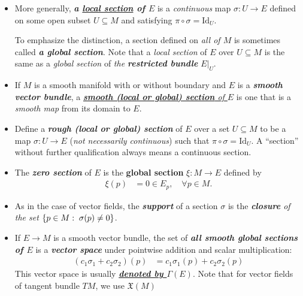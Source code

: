 \documentclass[11pt]{article}
\begin{document}
\begin{itemize}
\item \begin{definition} 
More generally, \emph{\textbf{a \underline{local section} of $E$}} is a \emph{continuous} map $\sigma: U \rightarrow E$ defined on some open subset $U \subseteq M$ and satisfying $\pi \circ \sigma =  \text{Id}_U.$ 

To emphasize the distinction, a section defined on \emph{all of $M$} is sometimes called \emph{\textbf{a global section}}. Note that a \emph{local section} of $E$ over $U \subseteq  M$ is the same as a \emph{global section} of \emph{the \textbf{restricted bundle}} $E|_{U}$.
\end{definition}


\item \begin{definition}
If $M$ is a smooth manifold with or without boundary and $E$ is a \emph{\textbf{smooth vector bundle}}, a \underline{\emph{\textbf{smooth (local or global) section} of $E$}} is one that is a
\emph{smooth map} from its domain to $E$.
\end{definition}

\item \begin{definition}
Define a \emph{\textbf{rough (local or global) section}} of $E$ over a set $U \subseteq M$ to be a map $\sigma: U \rightarrow E$ (\textit{not necessarily continuous}) such that  $\pi \circ \sigma =  \text{Id}_U$. A ``section” without further qualification always means a continuous section.
\end{definition}

\item \begin{definition}
The \emph{\textbf{zero section}} of $E$ is the \textbf{global section} $\xi: M \rightarrow E$ defined by
\begin{align*}
\xi(p) &= 0 \in E_{p}, \quad \forall p \in M.
\end{align*}
\end{definition}

\item \begin{definition}
As in the case of vector fields, the \emph{\textbf{support}} of a section $\sigma$ is the \emph{\textbf{closure} of the set} $\left\{p \in M:\;  \sigma(p) \neq 0\right\}$.
\end{definition}

\item \begin{definition}
If $E \rightarrow M$ is a smooth vector bundle, the set of \emph{\textbf{all smooth global sections of $E$}} is a \emph{\textbf{vector space}} under pointwise addition and scalar multiplication:
\begin{align*}
(c_1 \sigma_1 + c_2 \sigma_2)(p) &= c_1 \sigma_1(p) + c_2 \sigma_2(p)
\end{align*} This vector space is usually \underline{\textbf{\emph{denoted by $\Gamma(E)$}}}.  Note that for vector fields of tangent bundle $TM$, we use $\mathfrak{X}(M)$
\end{definition}


\end{itemize}
\end{document}
